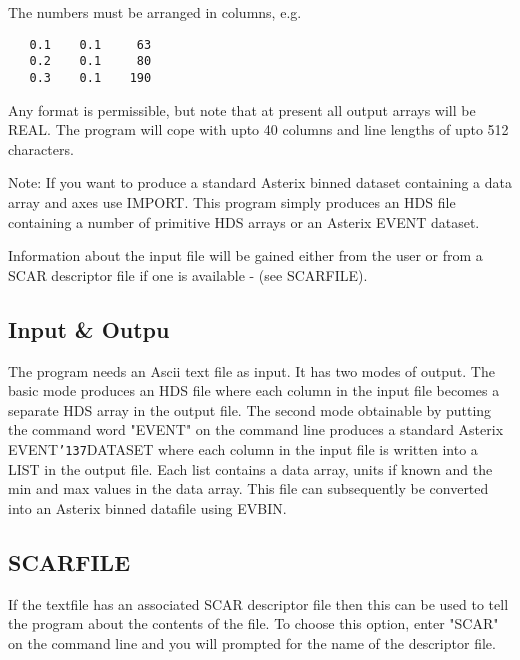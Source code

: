 \documentclass{book}
\renewcommand{\_}{{\tt\char'137}}     %
\begin{document}
The numbers must be arranged in columns, e.g.

\begin{verbatim}
   0.1    0.1     63
   0.2    0.1     80
   0.3    0.1    190
\end{verbatim}
Any format is permissible, but note that at present all output arrays
will be REAL. The program will cope with upto 40 columns and line
lengths of upto 512 characters.

Note: If you want to produce a standard Asterix binned dataset containing
a data array and axes use IMPORT. This program simply produces an
HDS file containing a number of primitive HDS arrays or an Asterix
EVENT dataset.

Information about the input file will be gained either from the user
or from a SCAR descriptor file if one is available - (see SCARFILE).

\subsection{Input \& Outpu}
The program needs an Ascii text file as input. It has two modes of
output. The basic mode produces an HDS file where each column in the
input file becomes a separate HDS array in the output file.
The second mode obtainable by putting the command word "EVENT" on
the command line produces a standard Asterix EVENT\_DATASET where each
column in the input file is written into a LIST in the output file.
Each list contains a data array, units if known and the min and
max values in the data array. This file can subsequently be converted
into an Asterix binned datafile using EVBIN.

\subsection{SCARFILE}
If the textfile has an associated SCAR descriptor file then this can
be used to tell the program about the contents of the file. To choose
this option, enter "SCAR" on the command line and you will prompted
for the name of the descriptor file.
\end{document}
